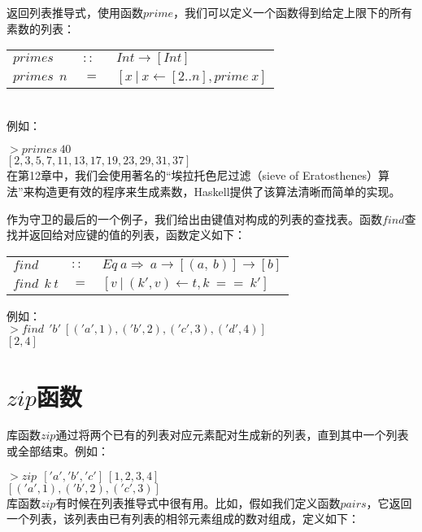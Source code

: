 返回列表推导式，使用函数$prime$，我们可以定义一个函数得到给定上限下的所有素数的列表：


\begin{tabular}[t]{lll}
  $primes$&$~::~$&$Int\rightarrow [Int]$\\
  $primes~~n$&$~=~$&$[x~|~x \leftarrow[2..n],prime~x]$\\
\end{tabular}\\

\noindent 例如：

\noindent\hspace*{1cm}$>primes~40$\\
\hspace*{1cm}$[2,3,5,7,11,13,17,19,23,29,31,37]$\\

在第12章中，我们会使用著名的“埃拉托色尼过滤（sieve of Eratosthenes）算法”来构造更有效的程序来生成素数，Haskell提供了该算法清晰而简单的实现。

作为守卫的最后的一个例子，我们给出由键值对构成的列表的查找表。函数$find$查找并返回给对应键的值的列表，函数定义如下：

\begin{tabular}[t]{lll}
  $find$&$::$&$Eq~a\Rightarrow ~a\rightarrow[(a,~b)]\rightarrow [b]$\\
  $find~~k~t$&$=$&$[v~|~(k', v) \leftarrow t, k~==~k']$
\end{tabular}

\noindent 例如：\\
\noindent\hspace*{1cm}$>find~~'b'~[('a', 1),('b', 2),('c', 3),('d',4)]$\\
\hspace*{1cm}$[2,4]$\\

\section{$zip$函数}
库函数$zip$通过将两个已有的列表对应元素配对生成新的列表，直到其中一个列表或全部结束。例如：

\noindent\hspace{1cm}$>zip~~['a','b','c']~[1,2,3,4]$\\
\hspace*{1cm}$[('a',1),('b',2),('c',3)]$\\

库函数$zip$有时候在列表推导式中很有用。比如，假如我们定义函数$pairs$，它返回一个列表，该列表由已有列表的相邻元素组成的数对组成，定义如下：\\

